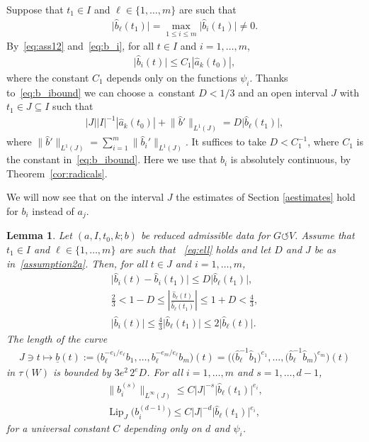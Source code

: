\documentclass[11pt]{article}
\numberwithin{equation}{section}
\numberwithin{equation}{section}
\newtheorem{Lemma}[Theorem]{Lemma}
\def\ta{\tau}
\def\ps{\psi}
\def\ul{\underline}
\def\Lip{\on{Lip}}
\def\we{\hat}
\def\acts{\circlearrowleft}
\let\on=\operatorname
\begin{document}
Suppose that $t_1 \in I$ and $\ell \in \{1,\dots,m\}$ are such that
\begin{gather} \label{eq:ell}
\big |\we b_\ell(t_1)\big| = \max_{1 \le i \le m}\big |\we b_i(t_1)\big| \ne 0.
\end{gather}
By~\eqref{eq:ass12} and~\eqref{eq:b_i}, for all $t \in I$ and $i = 1,\dots,m$,
 \begin{gather} \label{eq:b_ibound}
\big|\we b_i(t) \big| \le C_1 |\we a_k (t_0)|,
 \end{gather}
where the constant $C_1$ depends only on the functions $\ps_i$.
Thanks to~\eqref{eq:b_ibound} we can choose
a~con\-stant $D< 1/3$ and an open interval $J$ with $t_1 \in J \subseteq I$ such that
\begin{gather} \label{assumption2a}
 | J| |I|^{-1} {|\we a_k(t_0)|}
 + \big\|\we b '\big\|_{L^1 (J)} = D \big|\we b_\ell(t_1)\big|,
\end{gather}
where $\big\|\we b '\big\|_{L^1 (J)} = \sum_{i=1}^m\big \|\we b_i '\big\|_{L^1 (J)}$.
It suffices to take $D < C_1^{-1}$, where $C_1$ is the constant in~\eqref{eq:b_ibound}.
Here we use that $\we b _i$ is absolutely continuous,
by Theorem~\ref{cor:radicals}.

We will now see that on the interval $J$ the estimates of Section \ref{aestimates} hold for $b_i$
instead of $a_j$.


\begin{Lemma} \label{lemB}
 Let $(a, I, t_0, k; b)$ be reduced admissible data for $G \acts V$.
 Assume that $t_1 \in I$ and $\ell \in \{1,\dots,m\}$ are such that
~\eqref{eq:ell} holds and
 let $D$ and $J$ be as in~\eqref{assumption2a}.
 Then,
 for all $t \in J$ and $i = 1,\dots,m$,
 \begin{gather}
 \big| \we b_i (t) - \we b_i (t_1)\big| \le D \big|\we b_\ell (t_1)\big|, \label{b1}
 \\
 \frac 2 3 < 1-D \le \left | \frac{\we b_\ell(t)}{\we b_\ell(t_1)} \right| \le 1+D < \frac 4 3,
 \label{b2}
 \\
 \big|\we b_i(t)\big|\le \frac 4 3 \big|\we b_\ell(t_1)\big| \le 2 \big|\we b_\ell(t)\big|. \label{b3}
 \end{gather}
 The length of the curve
 \begin{gather*}
 J \ni t \mapsto \ul b(t)
 := \big( b_\ell^{-e_1/e_\ell} b_1, \dots, b_\ell^{-e_m/e_\ell} b_{m}\big)(t)
 = \big( \big(\we b_\ell^{-1} \we b_1\big)^{e_1}, \dots, \big(\we b_\ell^{-1} \we b_m\big)^{e_m}\big)(t)
 \end{gather*}
 in $\ta(W)$ is bounded by $3 e^2\, 2^{e} D$.
 For all $ i = 1,\dots,m$ and $ s = 1,\dots,d-1$,
 \begin{gather}
 \big\| b_i^{(s)} \big\|_{L^\infty(J)} \le C |J|^{-s} \big|\we b_\ell (t_1)\big|^{e_i},\nonumber
 \\
 \Lip_J\big(b_i^{(d-1)}\big) \le C |J|^{-d} \big|\we b_\ell (t_1)\big|^{e_i},\label{b4}
 \end{gather}
 for a universal constant $C$ depending only on $d$ and $\ps_i$.
\end{Lemma}
\end{document}
